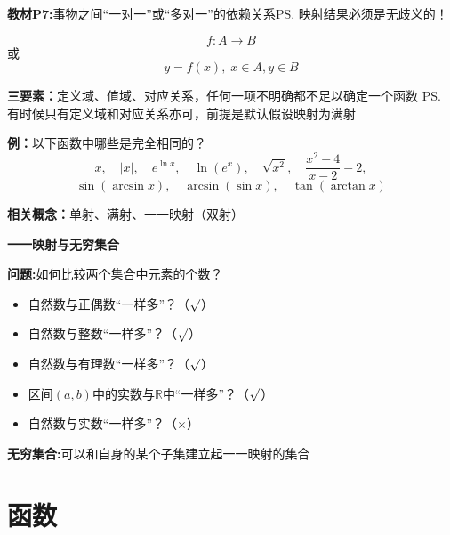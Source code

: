 {\bf 教材P7:}事物之间“一对一”或“多对一”的依赖关系\ps{映射结果必须是无歧义的！}

$$f:A\to B$$
或
$$y=f(x),\;x\in A,y\in B$$

{\bf 三要素：}定义域、值域、对应关系，任何一项不明确都不足以确定一个函数
\ps{有时候只有定义域和对应关系亦可，前提是默认假设映射为满射}

{{\bf 例：}以下函数中哪些是完全相同的？}
		$$x,\quad |x|,\quad e^{\ln x},\quad \ln(e^x),\quad \sqrt{x^2},\quad
		\frac{x^2-4}{x-2}-2,$$
		$$\sin(\arcsin x),\quad \arcsin(\sin x), \quad \tan(\arctan x)$$

{\bf 相关概念：}单射、满射、一一映射（双射）

\begin{shaded}
	{\bf 一一映射与无穷集合}
	
{\bf 问题:}如何比较两个集合中元素的个数？
\begin{itemize}
  \setlength{\itemindent}{1cm}
  \item 自然数与正偶数“一样多”？（{$\surd$}）
  \item 自然数与整数“一样多”？（{$\surd$}）
  \item 自然数与有理数“一样多”？（{$\surd$}）
  \item 区间$(a,b)$中的实数与$\mathbb{R}$中“一样多”？（{$\surd$}）
  \item 自然数与实数“一样多”？（{$\times$}）
\end{itemize}
	
{\bf 无穷集合:}可以和自身的某个子集建立起一一映射的集合
\end{shaded}	

	
\section{函数}
	
